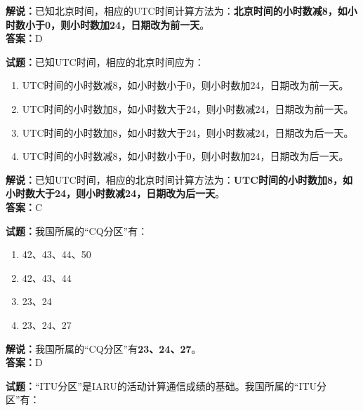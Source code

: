 \documentclass{ctexbook}
\begin{document}
\noindent\textbf{解说：}已知北京时间，相应的UTC时间计算方法为：\textbf{北京时间的小时数减8，如小时数小于0，则小时数加24，日期改为前一天}。\\\noindent\textbf{答案：}D


\bigskip


\noindent\textbf{试题：}已知UTC时间，相应的北京时间应为：

\begin{enumerate}[leftmargin=3em]
	\item UTC时间的小时数减8，如小时数小于0，则小时数加24，日期改为前一天。
	\item UTC时间的小时数加8，如小时数大于24，则小时数减24，日期改为前一天。
	\item UTC时间的小时数加8，如小时数大于24，则小时数减24，日期改为后一天。
	\item UTC时间的小时数减8，如小时数小于0，则小时数加24，日期改为后一天。
\end{enumerate}

\noindent\textbf{解说：}已知UTC时间，相应的北京时间计算方法为：\textbf{UTC时间的小时数加8，如小时数大于24，则小时数减24，日期改为后一天}。\\\noindent\textbf{答案：}C


\bigskip


\noindent\textbf{试题：}我国所属的“CQ分区”有：

\begin{enumerate}[leftmargin=3em]
	\item 42、43、44、50
	\item 42、43、44
	\item 23、24
	\item 23、24、27
\end{enumerate}

\noindent\textbf{解说：}我国所属的“CQ分区”有\textbf{23、24、27}。\\\noindent\textbf{答案：}D


\bigskip


\noindent\textbf{试题：}“ITU分区”是IARU的活动计算通信成绩的基础。我国所属的“ITU分区”有：
\end{document}
